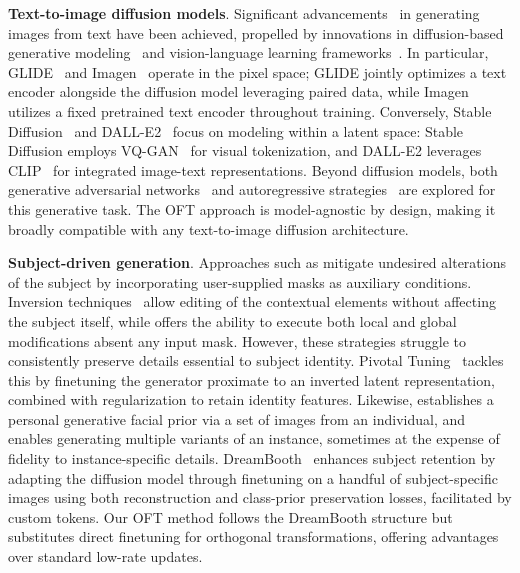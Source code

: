 \textbf{Text-to-image diffusion models}. Significant advancements~\cite{saharia2022photorealistic,ramesh2022hierarchical,rombach2022high,gu2022vector,nichol2022glide} in generating images from text have been achieved, propelled by innovations in diffusion-based generative modeling~\cite{ho2020denoising,song2021score,song2021denoising,dhariwal2021diffusion} and vision-language learning frameworks~\cite{su2020vlbert,lu2019vilbert,radford2021learning,wang2021simvlm,li2022blip,li2023blip,alayrac2022flamingo,schuhmann2022laion}. In particular, GLIDE~\cite{nichol2022glide} and Imagen~\cite{saharia2022photorealistic} operate in the pixel space; GLIDE jointly optimizes a text encoder alongside the diffusion model leveraging paired data, while Imagen utilizes a fixed pretrained text encoder throughout training. Conversely, Stable Diffusion~\cite{rombach2022high} and DALL-E2~\cite{ramesh2022hierarchical} focus on modeling within a latent space: Stable Diffusion employs VQ-GAN~\cite{esser2021taming} for visual tokenization, and DALL-E2 leverages CLIP~\cite{radford2021learning} for integrated image-text representations. Beyond diffusion models, both generative adversarial networks~\cite{reed2016generative,zhang2017stackgan,xu2018attngan,li2019controllable} and autoregressive strategies~\cite{ramesh2021zero,ding2021cogview,wu2022nuwa,yuscaling} are explored for this generative task. The OFT approach is model-agnostic by design, making it broadly compatible with any text-to-image diffusion architecture.

\textbf{Subject-driven generation}. Approaches such as \cite{avrahami2022blended,nichol2022glide} mitigate undesired alterations of the subject by incorporating user-supplied masks as auxiliary conditions. Inversion techniques~\cite{choi2021ilvr,dhariwal2021diffusion,ramesh2022hierarchical,gal2022image} allow editing of the contextual elements without affecting the subject itself, while \cite{hertz2022prompt} offers the ability to execute both local and global modifications absent any input mask. However, these strategies struggle to consistently preserve details essential to subject identity. Pivotal Tuning~\cite{roich2022pivotal} tackles this by finetuning the generator proximate to an inverted latent representation, combined with regularization to retain identity features. Likewise, \cite{nitzan2022mystyle} establishes a personal generative facial prior via a set of images from an individual, and \cite{casanova2021instance} enables generating multiple variants of an instance, sometimes at the expense of fidelity to instance-specific details. DreamBooth~\cite{ruiz2023dreambooth} enhances subject retention by adapting the diffusion model through finetuning on a handful of subject-specific images using both reconstruction and class-prior preservation losses, facilitated by custom tokens. Our OFT method follows the DreamBooth structure but substitutes direct finetuning for orthogonal transformations, offering advantages over standard low-rate updates.


